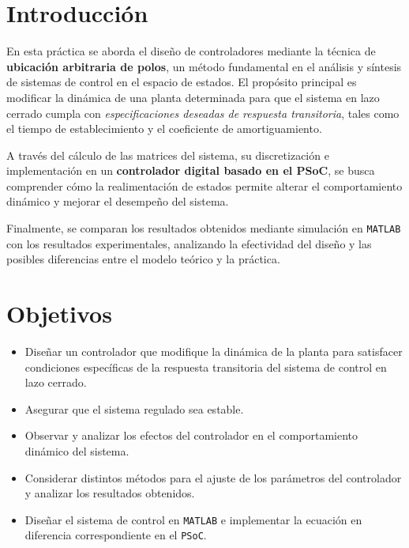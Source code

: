 \section{Introducción}

En esta práctica se aborda el diseño de controladores mediante la técnica de \textbf{ubicación arbitraria de polos}, un método fundamental en el análisis y síntesis de sistemas de control en el espacio de estados. El propósito principal es modificar la dinámica de una planta determinada para que el sistema en lazo cerrado cumpla con \textit{especificaciones deseadas de respuesta transitoria}, tales como el tiempo de establecimiento y el coeficiente de amortiguamiento.

A través del cálculo de las matrices del sistema, su discretización e implementación en un \textbf{controlador digital basado en el PSoC}, se busca comprender cómo la realimentación de estados permite alterar el comportamiento dinámico y mejorar el desempeño del sistema. 

Finalmente, se comparan los resultados obtenidos mediante simulación en \texttt{MATLAB} con los resultados experimentales, analizando la efectividad del diseño y las posibles diferencias entre el modelo teórico y la práctica.

\section*{Objetivos}

\begin{itemize}
	\item Diseñar un controlador que modifique la dinámica de la planta para satisfacer condiciones específicas de la respuesta transitoria del sistema de control en lazo cerrado.
	\item Asegurar que el sistema regulado sea estable.
	\item Observar y analizar los efectos del controlador en el comportamiento dinámico del sistema.
	\item Considerar distintos métodos para el ajuste de los parámetros del controlador y analizar los resultados obtenidos.
	\item Diseñar el sistema de control en \texttt{MATLAB} e implementar la ecuación en diferencia correspondiente en el \texttt{PSoC}.
\end{itemize}
